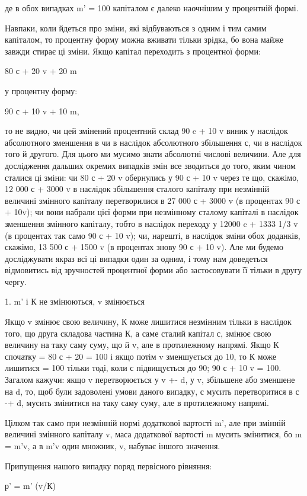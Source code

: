 де в обох випадках m' = 100%
капіталом є далеко наочнішим у процентній формі.

Навпаки, коли йдеться про зміни, які відбуваються з одним
і тим самим капіталом, то процентну форму можна вживати
тільки зрідка, бо вона майже завжди стирає ці зміни. Якщо
капітал переходить з процентної форми:

80 с + 20 v + 20 m

у процентну форму:

90 с + 10 v + 10 m,

то не видно, чи цей змінений процентний склад 90 c + 10 v виник
у наслідок абсолютного зменшення в чи в наслідок абсолютного
збільшення с, чи в наслідок того й другого. Для цього ми мусимо
знати абсолютні числові величини. Але для дослідження
дальших окремих випадків змін все зводиться до того, яким
чином сталися ці зміни: чи 80 с + 20 v обернулись у 90 с + 10 v
через те що, скажімо, 12 000 с + 3000 v в наслідок збільшення
сталого капіталу при незмінній величині змінного капіталу перетворилися
в 27 000 с + 3000 v (в процентах 90 с + 10v); чи вони
набрали цієї форми при незмінному сталому капіталі в наслідок
зменшення змінного капіталу, тобто в наслідок переходу у
12000 c + 1333 1/3 v (в процентах так само 90 с + 10 v); чи, нарешті,
в наслідок зміни обох доданків, скажімо, 13 500 с + 1500 v
(в процентах знову 90 с + 10 v). Але ми будемо досліджувати
якраз всі ці випадки один за одним, і тому нам доведеться
відмовитись від зручностей процентної форми або застосовувати
її тільки в другу чергу.

1. m' і К не змінюються, v змінюється

Якщо v змінює свою величину, К може лишитися незмінним
тільки в наслідок того, що друга складова частина К, а саме
сталий капітал с, змінює свою величину на таку саму суму, що й v,
але в протилежному напрямі. Якщо К спочатку = 80 с + 20 = 100
і якщо потім v зменшується до 10, то К може лишитися = 100
тільки тоді, коли с підвищується до 90; 90 с + 10 v = 100. Загалом
кажучи: якщо v перетворюється у v +- d, у v, збільшене або
зменшене на d, то, щоб були задоволені умови даного випадку,
с мусить перетворитися в с -+ d, мусить змінитися на таку саму
суму, але в протилежному напрямі.

Цілком так само при незмінній нормі додаткової вартості m',
але при змінній величині змінного капіталу v, маса додаткової
вартості m мусить змінитися, бо m = m'v, а в m'v один множник,
v, набуває іншого значення.

Припущення нашого випадку поряд первісного рівняння:

р' = m' (v/К)
